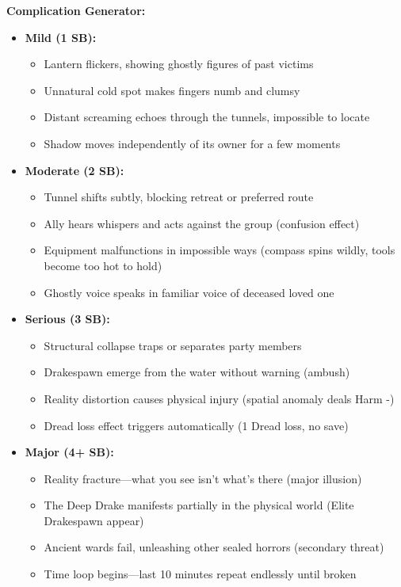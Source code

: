 \documentclass[11pt]{article}
\begin{document}
\textbf{Complication Generator:}
\begin{itemize}
\item \textbf{Mild (1 SB):} 
  \begin{itemize}
  \item Lantern flickers, showing ghostly figures of past victims
  \item Unnatural cold spot makes fingers numb and clumsy
  \item Distant screaming echoes through the tunnels, impossible to locate
  \item Shadow moves independently of its owner for a few moments
  \end{itemize}
\item \textbf{Moderate (2 SB):}
  \begin{itemize}
  \item Tunnel shifts subtly, blocking retreat or preferred route
  \item Ally hears whispers and acts against the group (confusion effect)
  \item Equipment malfunctions in impossible ways (compass spins wildly, tools become too hot to hold)
  \item Ghostly voice speaks in familiar voice of deceased loved one
  \end{itemize}
\item \textbf{Serious (3 SB):}
  \begin{itemize}
  \item Structural collapse traps or separates party members
  \item Drakespawn emerge from the water without warning (ambush)
  \item Reality distortion causes physical injury (spatial anomaly deals Harm -)
  \item Dread loss effect triggers automatically (1 Dread loss, no save)
  \end{itemize}
\item \textbf{Major (4+ SB):}
  \begin{itemize}
  \item Reality fracture—what you see isn't what's there (major illusion)
  \item The Deep Drake manifests partially in the physical world (Elite Drakespawn appear)
  \item Ancient wards fail, unleashing other sealed horrors (secondary threat)
  \item Time loop begins—last 10 minutes repeat endlessly until broken
  \end{itemize}
\end{itemize}
\end{document}
